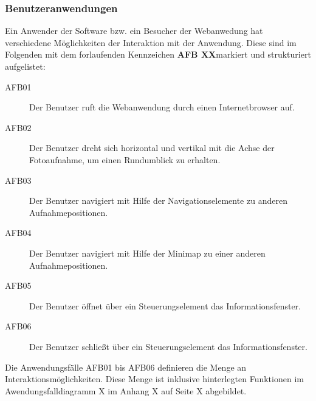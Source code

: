 \subsubsection{Benutzeranwendungen}
\label{sec:Benutzeranwendungen}

Ein Anwender der Software bzw. ein Besucher der Webanwedung hat verschiedene Möglichkeiten der Interaktion mit der Anwendung. Diese sind im Folgenden mit dem forlaufenden Kennzeichen \textbf{AFB XX}\footnotemark markiert und strukturiert aufgelistet:


\begin{description}
  \item[AFB01] Der Benutzer ruft die Webanwendung durch einen Internetbrowser auf.
  \item[AFB02] Der Benutzer dreht sich horizontal und vertikal mit die Achse der Fotoaufnahme, um einen Rundumblick zu erhalten.
  \item[AFB03] Der Benutzer navigiert mit Hilfe der Navigationselemente zu anderen Aufnahmepositionen.
  \item[AFB04] Der Benutzer navigiert mit Hilfe der Minimap zu einer anderen Aufnahmepositionen.
  \item[AFB05] Der Benutzer öffnet über ein Steuerungselement das Informationsfenster.
  \item[AFB06] Der Benutzer schließt über ein Steuerungselement das Informationsfenster.
\end{description}

Die Anwendungsfälle AFB01 bis AFB06 definieren die Menge an Interaktionsmöglichkeiten. Diese Menge ist inklusive hinterlegten Funktionen im Awendungsfalldiagramm X im Anhang X auf Seite X abgebildet.